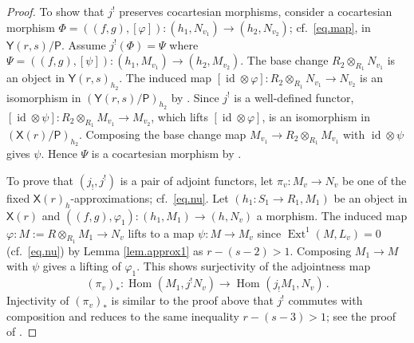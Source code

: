 \documentclass[a4paper,10pt]{amsart}
\theoremstyle{plain}
\theoremstyle{definition}
\theoremstyle{remark}
\numberwithin{equation}{xx}
\DeclareMathOperator{\Ext}{Ext}
\DeclareMathOperator{\Hom}{Hom}
\DeclareMathOperator{\id}{id}
\newcommand{\co}{\colon}
\newcommand{\ra}{\rightarrow}
\newcommand{\lra}{\longrightarrow}
\newcommand{\ot}{{\otimes}}
\renewcommand{\phi}{\varphi}
\newcommand{\cat}[1]{\mathsf{{#1}}}
\newcommand{\hm}[4]{{\Hom}_{#2}^{#1}({#3},{#4})}
\newcommand{\xt}[4]{{\Ext} _{#2}^{#1}({#3},{#4})}
\begin{document}
\begin{proof}
To show that \(j^{!}\) preserves cocartesian morphisms, consider a cocartesian morphism \(\Phi=((f,g),[\phi])\co(h_{1},N_{v_{1}})\ra (h_{2},N_{v_{2}})\); cf.\ \eqref{eq.map}, in \(\cat{Y}(r,s)/\cat{P}\). Assume \(j^{!}(\Phi)=\Psi\) where \(\Psi=((f,g),[\psi])\co (h_{1},M_{v_{1}})\ra (h_{2},M_{v_{2}})\). The base change \(R_{2}\ot_{R_{1}}N_{v_{1}}\) is an object in \(\cat{Y}(r,s)_{h_{2}}\). The induced map \([\id\ot\phi]\co R_{2}\ot_{R_{1}}N_{v_{1}}\ra N_{v_{2}}\) is an isomorphism in \((\cat{Y}(r,s)/\cat{P})_{h_{2}}\) by \cite[3.5]{ile:12a}. Since \(j^{!}\) is a well-defined functor, \([\id\ot\psi]\co R_{2}\ot_{R_{1}}M_{v_{1}}\ra M_{v_{2}}\), which lifts \([\id\ot\phi]\), is an isomorphism in \((\cat{X}(r)/\cat{P})_{h_{2}}\). Composing the base change map \(M_{v_{1}}\ra R_{2}\ot_{R_{1}}M_{v_{1}}\) with \(\id\ot\psi\) gives \(\psi\). Hence \(\Psi\) is a cocartesian morphism by \cite[3.5]{ile:12a}.

To prove that \((j_{!},j^{!})\) is a pair of adjoint functors, let \(\pi_{v}\co M_{v}\ra N_{v}\) be one of the fixed \(\cat{X}(r)_{h}\)-approximations; cf.\ \eqref{eq.nu}. Let \((h_{1}:S_{1}\ra R_{1},M_{1})\) be an object in \(\cat{X}(r)\) and \(((f,g),\phi_{1})\co (h_{1},M_{1})\ra (h,N_{v})\) a morphism. The induced map \(\phi\co M:=R\ot_{R_{1}}M_{1}\ra N_{v}\) lifts to a map \(\psi\co M\ra M_{v}\) since \(\xt{1}{}{M}{L_{v}}=0\) (cf.\ \eqref{eq.nu}) by Lemma \ref{lem.approx1} as \(r-(s-2)>1\). Composing \(M_{1}\ra M\) with \(\psi\) gives a lifting of \(\phi_{1}\). This shows surjectivity of the adjointness map 
\begin{equation}
(\pi_{v})_{*}\co \hm{}{}{M_{1}}{j^{!}N_{v}}\lra \hm{}{}{j_{!}M_{1}}{N_{v}}\,.
\end{equation}
Injectivity of \((\pi_{v})_{*}\) is similar to the proof above that \(j^{!}\) commutes with composition and reduces to the same inequality \(r-(s-3)>1\); see the proof of \cite[4.5]{ile:12a}.


\end{proof}
\end{document}
